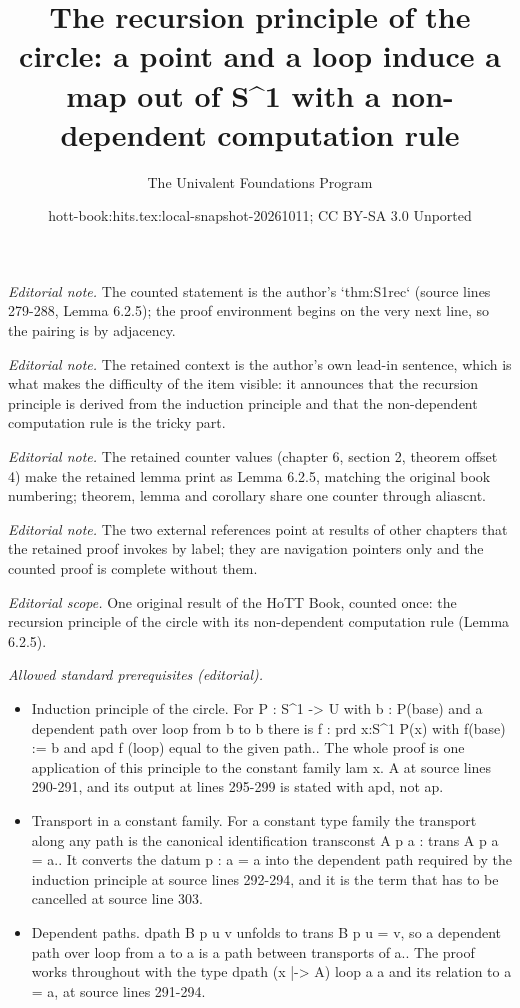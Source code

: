 \documentclass[10pt,a4paper]{article}
\title{The recursion principle of the circle: a point and a loop induce a map out of S\textasciicircum{}1 with a non-dependent computation rule}
\author{The Univalent Foundations Program}
\date{hott-book:hits.tex:local-snapshot-20261011; CC BY-SA 3.0 Unported}
\newcounter{chapter}
\theoremstyle{definition}
\theoremstyle{remark}
\numberwithin{equation}{section}
\begin{document}
\maketitle
\setcounter{chapter}{6}
\setcounter{section}{2}
\setcounter{thm}{4}
\noindent\textit{Editorial note.} The counted statement is the author's `thm:S1rec` (source lines 279-288, Lemma 6.2.5); the proof environment begins on the very next line, so the pairing is by adjacency.\par\medskip
\noindent\textit{Editorial note.} The retained context is the author's own lead-in sentence, which is what makes the difficulty of the item visible: it announces that the recursion principle is derived from the induction principle and that the non-dependent computation rule is the tricky part.\par\medskip
\noindent\textit{Editorial note.} The retained counter values (chapter 6, section 2, theorem offset 4) make the retained lemma print as Lemma 6.2.5, matching the original book numbering; theorem, lemma and corollary share one counter through aliascnt.\par\medskip
\noindent\textit{Editorial note.} The two external references point at results of other chapters that the retained proof invokes by label; they are navigation pointers only and the counted proof is complete without them.\par\medskip
\noindent\textit{Editorial scope.} One original result of the HoTT Book, counted once: the recursion principle of the circle with its non-dependent computation rule (Lemma 6.2.5).\par\medskip
\noindent\textit{Allowed standard prerequisites (editorial).}\begin{itemize}
\item Induction principle of the circle. For P : S\textasciicircum{}1 -> U with b : P(base) and a dependent path over loop from b to b there is f : prd x:S\textasciicircum{}1 P(x) with f(base) := b and apd f (loop) equal to the given path.. The whole proof is one application of this principle to the constant family lam x. A at source lines 290-291, and its output at lines 295-299 is stated with apd, not ap.
\item Transport in a constant family. For a constant type family the transport along any path is the canonical identification transconst A p a : trans A p a = a.. It converts the datum p : a = a into the dependent path required by the induction principle at source lines 292-294, and it is the term that has to be cancelled at source line 303.
\item Dependent paths. dpath B p u v unfolds to trans B p u = v, so a dependent path over loop from a to a is a path between transports of a.. The proof works throughout with the type dpath (x |-> A) loop a a and its relation to a = a, at source lines 291-294.
\end{itemize}\medskip
\end{document}
